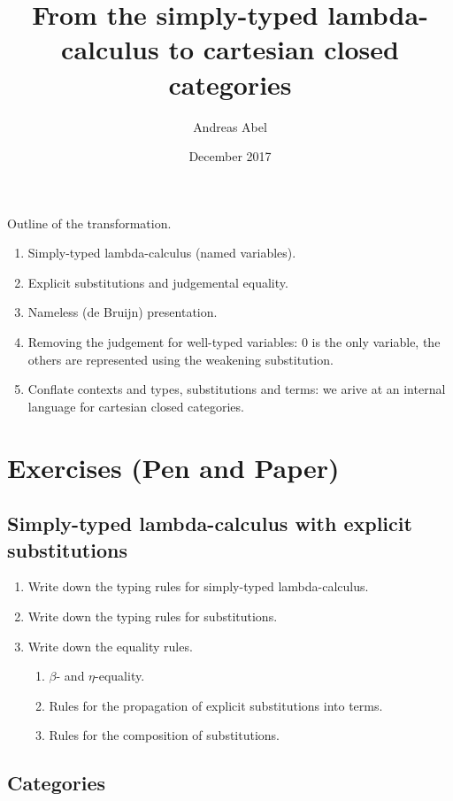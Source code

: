 \documentclass[a4paper]{scrartcl}
\title{From the simply-typed lambda-calculus to
  cartesian closed categories}
\author{Andreas Abel}
\date{December 2017}
\begin{document}
\maketitle

Outline of the transformation.
\begin{enumerate}
\item Simply-typed lambda-calculus (named variables).
\item Explicit substitutions and judgemental equality.
\item Nameless (de Bruijn) presentation.
\item Removing the judgement for well-typed variables: $0$ is the only
  variable, the others are represented using the weakening
  substitution.
\item Conflate contexts and types, substitutions and terms: we arive
  at an internal language for cartesian closed categories.
\end{enumerate}

\clearpage

\section{Exercises (Pen and Paper)}

\subsection{Simply-typed lambda-calculus with explicit substitutions}

\begin{enumerate}
\item Write down the typing rules for simply-typed lambda-calculus.
\item Write down the typing rules for substitutions.
\item Write down the equality rules.
  \begin{enumerate}
  \item $\beta$- and $\eta$-equality.
  \item Rules for the propagation of explicit substitutions into
    terms.
  \item Rules for the composition of substitutions.
  \end{enumerate}
\end{enumerate}

\subsection{Categories}
\end{document}
